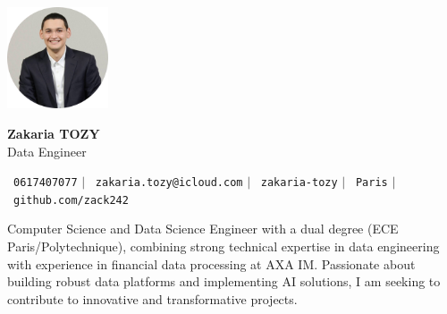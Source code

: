 \documentclass[11pt,a4paper]{article}
\begin{document}
\begin{flushleft}
  \begin{minipage}[c]{0.2\textwidth}
    \includegraphics[width=3cm]{images/profilpicture.png}
  \end{minipage}%
  \begin{minipage}[c]{0.8\textwidth}
    \hspace{10pt}
    {\huge \textbf{Zakaria TOZY}} \\ \vspace{10pt}
    \hspace{9pt}
    {\normalsize Data Engineer} \vspace{2pt}
  \end{minipage}
\end{flushleft}

\vspace{-5pt}

\begin{center}
    \small \faPhone\ \texttt{0617407077} \hspace{1pt} $|$
    \hspace{1pt} \faEnvelope\ \texttt{zakaria.tozy@icloud.com} \hspace{1pt} $|$
    \hspace{1pt} \faLinkedin\ \texttt{zakaria-tozy} \hspace{1pt} $|$
    \hspace{1pt} \faMapMarker\ \texttt{Paris} \hspace{1pt} $|$
    \hspace{1pt} \faGithub\ \texttt{github.com/zack242} \\ \vspace{0pt}
\end{center}

\begin{itemize}[leftmargin=0in, label={}]
\footnotesize{\item{
Computer Science and Data Science Engineer with a dual degree (ECE Paris/Polytechnique), combining strong technical expertise in data engineering with experience in financial data processing at AXA IM. Passionate about building robust data platforms and implementing AI solutions, I am seeking to contribute to innovative and transformative projects.
}}
\end{itemize}
\end{document}
